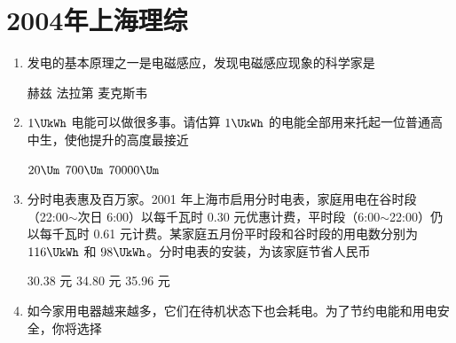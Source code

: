 \documentclass[\gkver]{gaokaozhenti}
\begin{document}
\chapter{2004年上海理综}

\begin{enumerate}
\item
发电的基本原理之一是电磁感应，发现电磁感应现象的科学家是

{赫兹}
{法拉第}
{麦克斯韦}


\item
$1\UkWh$ 电能可以做很多事。请估算 $1\UkWh$ 的电能全部用来托起一位普通高中生，使他提升的高度最接近

\fourchoices[answer=D]
{$2\Um$}
{$20\Um$}
{$700\Um$}
{$70000\Um$}


\item
分时电表惠及百万家。2001 年上海市启用分时电表，家庭用电在谷时段（22:00$\sim$次日 6:00）以每千瓦时 0.30 元优惠计费，平时段（6:00$\sim$22:00）仍以每千瓦时 0.61 元计费。某家庭五月份平时段和谷时段的用电数分别为 $116\UkWh$ 和 $98\UkWh$。分时电表的安装，为该家庭节省人民币

{30.38 元}
{34.80 元}
{35.96 元}


\item
如今家用电器越来越多，它们在待机状态下也会耗电。为了节约电能和用电安全，你将选择


\end{enumerate}
\end{document}
